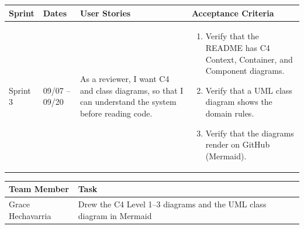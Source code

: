 \documentclass[12pt]{article}
\begin{document}
\noindent\begin{minipage}{\linewidth}

\vspace{0.5em}
\noindent
\begin{tabular}{|L{1.2cm}|L{1.8cm}|L{5.2cm}|L{6.3cm}|}
\hline
\textbf{Sprint} & \textbf{Dates} & \textbf{User Stories} & \textbf{Acceptance Criteria} \\
\hline
Sprint 3 & 09/07 -- 09/20 &
As a reviewer, I want C4 and class diagrams, so that I can understand the system before reading code. &
\begin{enumerate}
    \item Verify that the README has C4 Context, Container, and Component diagrams.
    \item Verify that a UML class diagram shows the domain rules.
    \item Verify that the diagrams render on GitHub (Mermaid).
\end{enumerate} \\
\hline
\end{tabular}

\vspace{0.5em}
\noindent
\begin{tabular}{|L{3.4cm}|L{11.6cm}|}
\hline
\textbf{Team Member} & \textbf{Task} \\
\hline
Grace Hechavarria & Drew the C4 Level 1--3 diagrams and the UML class diagram in Mermaid \\
\hline
\end{tabular}
\end{minipage}

\vspace{1.5em}
\end{document}
